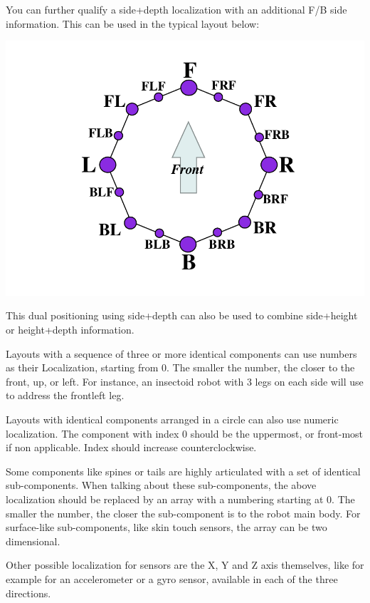 You can further qualify a side+depth localization with an additional
F/B side information. This can be used in the typical layout below:

\begin{center}
  \includegraphics{img/localizer-multidim}
\end{center}

This dual positioning using side+depth can also be used to combine
side+height or height+depth information.

Layouts with a sequence of three or more identical components can use
numbers as their Localization, starting from 0.  The smaller the number, the
closer to the front, up, or left. For instance, an insectoid robot with 3
legs on each side will use  to address the
frontleft leg.

Layouts with identical components arranged in a circle can also use numeric
localization. The component with index 0 should be the uppermost, or
front-most if non applicable. Index should increase counterclockwise.

Some components like spines or tails are highly articulated with a set of
identical sub-components. When talking about these sub-components, the above
localization should be replaced by an array with a numbering starting at
0. The smaller the number, the closer the sub-component is to the robot main
body. For surface-like sub-components, like skin touch sensors, the array
can be two dimensional.


Other possible localization for sensors are the X, Y and Z axis
themselves, like for example for an accelerometer or a gyro sensor,
available in each of the three directions.

